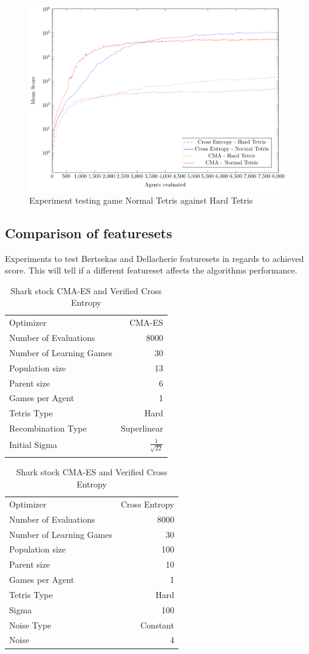 \begin{figure}[H]
\centering
\includegraphics[scale=1]{data/complexity/mean/PlotFile.pdf}
\caption{Experiment testing game Normal Tetris against Hard Tetris}
\end{figure}

\clearpage

\subsection{Comparison of featuresets}
Experiments to test Bertsekas and Dellacherie featuresets in regards to achieved score. This will tell if a different featureset affects the algorithms performance. 

\begin{table}[h]
\centering
\small
\caption{Shark stock CMA-ES and Verified Cross Entropy}
\begin{tabular}{l r}
Optimizer & CMA-ES\\
Number of Evaluations & 8000\\
Number of Learning Games & 30\\
Population size& 13\\
Parent size & 6\\
Games per Agent & 1\\
Tetris Type & Hard\\
\hline
Recombination Type & Superlinear\\
Initial Sigma & $\frac{1}{\sqrt{22}}$\\
\quad & \quad
\end{tabular}
\quad
\begin{tabular}{l r}
Optimizer & Cross Entropy\\
Number of Evaluations & 8000\\
Number of Learning Games & 30\\
Population size & 100\\
Parent size & 10\\
Games per Agent & 1\\
Tetris Type & Hard\\
\hline
Sigma & 100\\
Noise Type & Constant\\
Noise & 4
\end{tabular}
\end{table}

